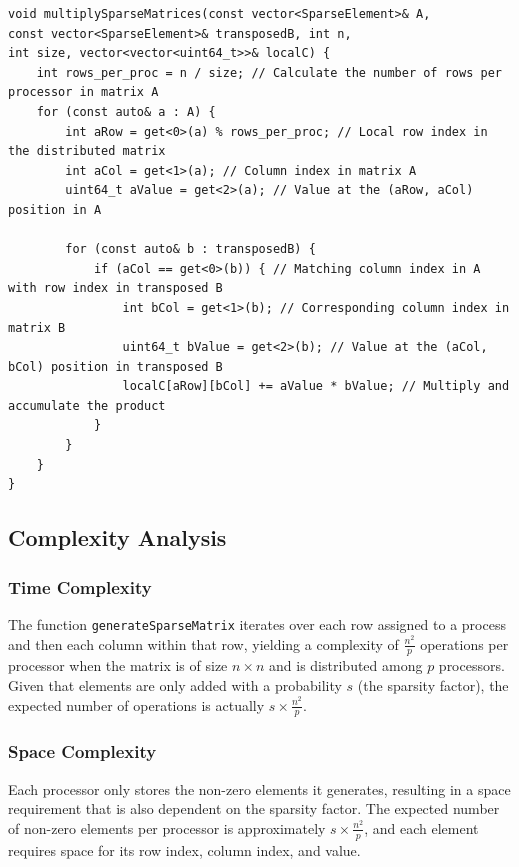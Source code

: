 \documentclass{article}
\begin{document}
\begin{verbatim}
void multiplySparseMatrices(const vector<SparseElement>& A,
const vector<SparseElement>& transposedB, int n,
int size, vector<vector<uint64_t>>& localC) {
    int rows_per_proc = n / size; // Calculate the number of rows per processor in matrix A
    for (const auto& a : A) {
        int aRow = get<0>(a) % rows_per_proc; // Local row index in the distributed matrix
        int aCol = get<1>(a); // Column index in matrix A
        uint64_t aValue = get<2>(a); // Value at the (aRow, aCol) position in A

        for (const auto& b : transposedB) {
            if (aCol == get<0>(b)) { // Matching column index in A with row index in transposed B
                int bCol = get<1>(b); // Corresponding column index in matrix B
                uint64_t bValue = get<2>(b); // Value at the (aCol, bCol) position in transposed B
                localC[aRow][bCol] += aValue * bValue; // Multiply and accumulate the product
            }
        }
    }
}
\end{verbatim}

\subsection{Complexity Analysis}

\subsubsection{Time Complexity}
The function \texttt{generateSparseMatrix} iterates over each row assigned to a process and then each column within that row, yielding a complexity of \(\frac{n^2}{p}\) operations per processor when the matrix is of size \(n \times n\) and is distributed among \(p\) processors. Given that elements are only added with a probability \(s\) (the sparsity factor), the expected number of operations is actually \(s \times \frac{n^2}{p}\).

\subsubsection{Space Complexity}
Each processor only stores the non-zero elements it generates, resulting in a space requirement that is also dependent on the sparsity factor. The expected number of non-zero elements per processor is approximately \(s \times \frac{n^2}{p}\), and each element requires space for its row index, column index, and value.
\end{document}
